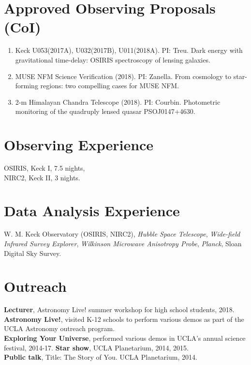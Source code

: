 \documentclass[margin,line]{res}
\begin{document}
\begin{resume}
\section{\sc Approved Observing Proposals (CoI)}
\begin{enumerate}
\item Keck U053(2017A), U032(2017B), U011(2018A). PI: Treu. Dark energy with gravitational time-delay: OSIRIS spectroscopy of lensing galaxies.
\item MUSE NFM Science Verification (2018). PI: Zanella. From cosmology to star-forming regions: two compelling cases for MUSE NFM.
\item 2-m Himalayan Chandra Telescope (2018). PI: Courbin. Photometric monitoring of the quadruply lensed quasar PSOJ0147+4630. 
\end{enumerate}

\section{\sc Observing Experience}
OSIRIS, Keck I, 7.5 nights,\\
NIRC2, Keck II, 3 nights. 


\section{\sc Data Analysis Experience} 
W. M. Keck Observatory (OSIRIS, NIRC2),
\textit{Hubble Space Telescope},
{\it Wide-field Infrared Survey Explorer},
{\it Wilkinson Microwave Anisotropy Probe},
{\it Planck},
Sloan Digital Sky Survey.


\section{\sc Outreach}
{\bf Lecturer}, Astronomy Live! summer workshop for high school students, 2018. \\
{\bf Astronomy Live!}, visited K-12 schools to perform various demos as part of the UCLA Astronomy outreach program. \\
{\bf Exploring Your Universe}, performed various demos in UCLA's annual science festival, 2014-17.
{\bf Star show}, UCLA Planetarium, 2014, 2015. \\
{\bf Public talk}, Title: The Story of You. UCLA Planetarium, 2014. \\


\end{resume}
\end{document}

